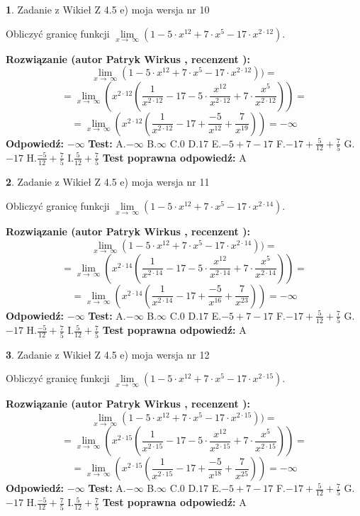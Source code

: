 \documentclass[12pt, a4paper]{article}
\theoremstyle{definition} %
\newtheorem{zad}{}
\newcommand{\zadStart}[1]{\begin{zad}#1\newline}
\newcommand{\zadStop}{\end{zad}}
\newcommand{\rozwStart}[2]{\noindent \textbf{Rozwiązanie (autor #1 , recenzent #2): }\newline}
\newcommand{\rozwStop}{\newline}
\newcommand{\odpStart}{\noindent \textbf{Odpowiedź:}\newline}
\newcommand{\odpStop}{\newline}
\newcommand{\testStart}{\noindent \textbf{Test:}\newline}
\newcommand{\testStop}{\newline}
\newcommand{\kluczStart}{\noindent \textbf{Test poprawna odpowiedź:}\newline}
\newcommand{\kluczStop}{\newline}
\begin{document}
\zadStart{Zadanie z Wikieł Z 4.5 e) moja wersja nr 10}



Obliczyć granicę funkcji  $\lim\limits_{x\to\ \infty}(1 - 5 \cdot x^{12}+7 \cdot x^{5}- 17 \cdot x^{2\cdot12})$.
\zadStop
\rozwStart{Patryk Wirkus}{}
$$\lim\limits_{x\to\ \infty}(1 - 5 \cdot x^{12}+7 \cdot x^{5}- 17 \cdot x^{2\cdot12}))=$$
$$=\lim\limits_{x\to\ \infty}(x^{2\cdot12}(\frac{1}{x^{2\cdot12}}-17 -5 \cdot \frac{x^{12}}{x^{2\cdot12}}+7 \cdot \frac{x^{5}}{x^{2\cdot12}}))=$$
$$=\lim\limits_{x\to\ \infty}(x^{2\cdot12}(\frac{1}{x^{2\cdot12}}-17 + \frac{-5}{x^{12}}+ \frac{7}{x^{19}}))=-\infty$$
\rozwStop
\odpStart
$-\infty$
\odpStop
\testStart
A.$-\infty$ B.$\infty$ C.$0$ D.$17$ E.$-5 + 7 - 17$
F.$-17+\frac{5}{12}+\frac{7}{5}$ G.$-17$
H.$\frac{-5}{12}+\frac{7}{5}$
I.$\frac{5}{12}+\frac{7}{5}$
\testStop
\kluczStart
A
\kluczStop



\zadStart{Zadanie z Wikieł Z 4.5 e) moja wersja nr 11}



Obliczyć granicę funkcji  $\lim\limits_{x\to\ \infty}(1 - 5 \cdot x^{12}+7 \cdot x^{5}- 17 \cdot x^{2\cdot14})$.
\zadStop
\rozwStart{Patryk Wirkus}{}
$$\lim\limits_{x\to\ \infty}(1 - 5 \cdot x^{12}+7 \cdot x^{5}- 17 \cdot x^{2\cdot14}))=$$
$$=\lim\limits_{x\to\ \infty}(x^{2\cdot14}(\frac{1}{x^{2\cdot14}}-17 -5 \cdot \frac{x^{12}}{x^{2\cdot14}}+7 \cdot \frac{x^{5}}{x^{2\cdot14}}))=$$
$$=\lim\limits_{x\to\ \infty}(x^{2\cdot14}(\frac{1}{x^{2\cdot14}}-17 + \frac{-5}{x^{16}}+ \frac{7}{x^{23}}))=-\infty$$
\rozwStop
\odpStart
$-\infty$
\odpStop
\testStart
A.$-\infty$ B.$\infty$ C.$0$ D.$17$ E.$-5 + 7 - 17$
F.$-17+\frac{5}{12}+\frac{7}{5}$ G.$-17$
H.$\frac{-5}{12}+\frac{7}{5}$
I.$\frac{5}{12}+\frac{7}{5}$
\testStop
\kluczStart
A
\kluczStop



\zadStart{Zadanie z Wikieł Z 4.5 e) moja wersja nr 12}



Obliczyć granicę funkcji  $\lim\limits_{x\to\ \infty}(1 - 5 \cdot x^{12}+7 \cdot x^{5}- 17 \cdot x^{2\cdot15})$.
\zadStop
\rozwStart{Patryk Wirkus}{}
$$\lim\limits_{x\to\ \infty}(1 - 5 \cdot x^{12}+7 \cdot x^{5}- 17 \cdot x^{2\cdot15}))=$$
$$=\lim\limits_{x\to\ \infty}(x^{2\cdot15}(\frac{1}{x^{2\cdot15}}-17 -5 \cdot \frac{x^{12}}{x^{2\cdot15}}+7 \cdot \frac{x^{5}}{x^{2\cdot15}}))=$$
$$=\lim\limits_{x\to\ \infty}(x^{2\cdot15}(\frac{1}{x^{2\cdot15}}-17 + \frac{-5}{x^{18}}+ \frac{7}{x^{25}}))=-\infty$$
\rozwStop
\odpStart
$-\infty$
\odpStop
\testStart
A.$-\infty$ B.$\infty$ C.$0$ D.$17$ E.$-5 + 7 - 17$
F.$-17+\frac{5}{12}+\frac{7}{5}$ G.$-17$
H.$\frac{-5}{12}+\frac{7}{5}$
I.$\frac{5}{12}+\frac{7}{5}$
\testStop
\kluczStart
A
\kluczStop
\end{document}
